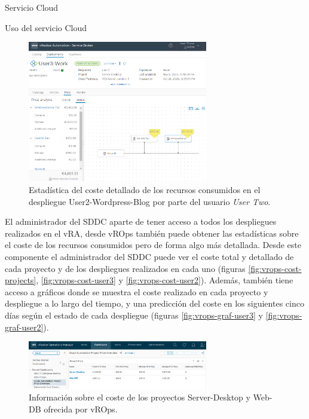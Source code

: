 \begin{subsection}{Servicio Cloud}
\begin{subsubsection}{Uso del servicio Cloud}
\begin{figure}[h]
            \label{fig:user2-daily-price}
        \end{figure}
        \FloatBarrier
        \begin{figure}[h]
            \centering
            \includegraphics[width=0.7\textwidth]{imaxes/pruebaconcepto/vrealize/user3-price-details.png}
            \caption{Estadística del coste detallado de los recursos consumidos en el despliegue User2-Wordpress-Blog por parte del usuario \textit{User Two}.}
            \label{fig:user2-detail-price}
        \end{figure}
        \FloatBarrier
        El administrador del SDDC aparte de tener acceso a todos los despliegues realizados en el vRA, desde vROps también puede obtener las estadísticas sobre el coste de los recursos consumidos pero de forma algo más detallada. Desde este componente el administrador del SDDC puede ver el coste total y detallado de cada proyecto y de los despliegues realizados en cada uno (figuras \ref{fig:vrops-cost-projects}, \ref{fig:vrops-cost-user3} y \ref{fig:vrops-cost-user2}). Además, también tiene acceso a gráficos donde se muestra el coste realizado en cada proyecto y despliegue a lo largo del tiempo, y una predicción del coste en los siguientes cinco días según el estado de cada despliegue (figuras \ref{fig:vrops-graf-user3} y \ref{fig:vrops-graf-user2}).
        \begin{figure}[h]
            \centering
            \includegraphics[width=0.7\textwidth]{imaxes/pruebaconcepto/vrealize/vrops-projects-price.png}
            \caption{Información sobre el coste de los proyectos Server-Desktop y Web-DB ofrecida por vROps.}

\end{figure}
\end{subsubsection}
\end{subsection}
